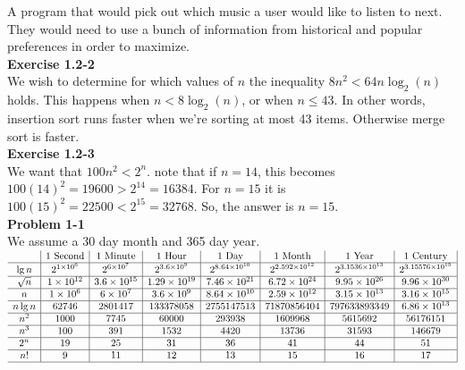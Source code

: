 \documentclass{article}
\begin{document}
A program that would pick out which music a user would like to listen to next. They would need to use a bunch of information from historical and popular preferences in order to maximize. \\

\noindent\textbf{Exercise 1.2-2}\\

We wish to determine for which values of $n$ the inequality $8n^2 < 64n \log_2(n)$ holds.  This happens when $n < 8 \log_2(n)$, or when $n \leq 43$.  In other words, insertion sort runs faster when we're sorting at most 43 items.  Otherwise merge sort is faster. \\

\noindent\textbf{Exercise 1.2-3} \\

We want that $100n^2<2^n$. note that if $n=14$, this becomes $100(14)^2=19600 > 2^14  = 16384$. For $n=15$ it is $100(15)^2 = 22500 < 2^{15} = 32768$. So, the answer is $n=15$. \\

\noindent\textbf{Problem 1-1} \\

We assume a 30 day month and 365 day year. \\

$
\begin{array}{c|c|c|c|c|c|c|c|}
&1 \mbox{ Second}&1 \mbox{ Minute} &1 \mbox{ Hour}&1 \mbox{ Day}&1 \mbox{ Month}&1 \mbox{ Year}&1 \mbox{ Century}\\
\hline
\lg n& 2^{1\times10^6}&2^{6\times10^7} &2^{3.6\times10^9} &2^{8.64\times10^{10}} &2^{2.592\times10^{12}} & 2^{3.1536\times10^{13} } & 2^{3.15576\times10^{15}} \\
\hline
\sqrt{n} &1\times10^{12} &3.6\times10^{15} &1.29\times10^{19} & 7.46\times10^{21}& 6.72\times10^{24}& 9.95\times10^{26}&9.96\times10^{30} \\
\hline
n &1\times10^6&6\times10^7 &3.6\times10^9 &8.64\times10^{10} &2.59\times10^{12}  & 3.15\times10^{13} & 3.16\times10^{15}\\
\hline
n \lg n & 62746 & 2801417 &133378058 &2755147513 &71870856404 & 797633893349 &6.86 \times 10^{13} \\
\hline
n^2 &1000 & 7745& 60000&293938 & 1609968& 5615692& 56176151\\
\hline
n^3 & 100& 391& 1532& 4420& 13736&31593 &146679 \\
\hline
2^n & 19 & 25& 31&36 &41 & 44 &51 \\
\hline
n! & 9&11 & 12& 13& 15& 16& 17\\
\hline
\end{array}
$
\end{document}
